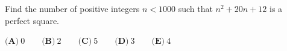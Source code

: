 Find the number of positive integers $n < 1000$ such that $n^2 + 20n + 12$ is a perfect square.

$\textbf{(A)}~0\qquad\textbf{(B)}~2\qquad\textbf{(C)}~5\qquad\textbf{(D)}~3\qquad\textbf{(E)}~4\qquad$
